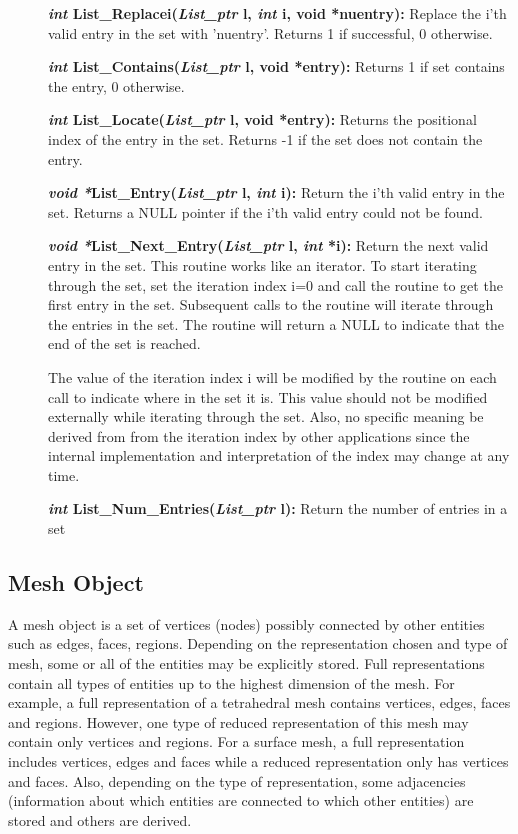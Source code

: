 \documentclass[12pt]{article}
\begin{document}
\begin{description}
\item[]\textbf{\textit{int} List\_Replacei(\textit{List\_ptr} l, \textit{int}
i, void *nuentry):} Replace the i'th valid entry in the set with
'nuentry'. Returns 1 if successful, 0 otherwise.

\item[]\textbf{\textit{int} List\_Contains(\textit{List\_ptr} l, void *entry):}
Returns 1 if set contains the entry, 0 otherwise.

\item[]\textbf{\textit{int} List\_Locate(\textit{List\_ptr} l, void *entry):}
Returns the positional index of the entry in the set. Returns -1 if
the set does not contain the entry.

\item[]\textbf{\textit{void *}List\_Entry(\textit{List\_ptr} l, \textit{int}
i):} Return the i'th valid entry in the set.  Returns a NULL pointer if
the i'th valid entry could not be found.

\item[]\textbf{\textit{void *}List\_Next\_Entry(\textit{List\_ptr} l,
\textit{int} *i):} Return the next valid entry in the set. This routine
works like an iterator. To start iterating through the set, set the
iteration index i=0 and call the routine to get the first entry in the
set. Subsequent calls to the routine will iterate through the entries
in the set. The routine will return a NULL to indicate that the end of
the set is reached.

The value of the iteration index i will be modified by the routine on
each call to indicate where in the set it is. This value should not be
modified externally while iterating through the set. Also, no specific
meaning be derived from from the iteration index by other applications
since the internal implementation and interpretation of the index may
change at any time.

\item[]\textbf{\textit{int} List\_Num\_Entries(\textit{List\_ptr} l):} Return
the number of entries in a set
\end{description}

\newpage
\subsection{Mesh Object}

A mesh object is a set of vertices (nodes) possibly connected by other
entities such as edges, faces, regions. Depending on the
representation chosen and type of mesh, some or all of the entities
may be explicitly stored.  Full representations contain all types of
entities up to the highest dimension of the mesh. For example, a full
representation of a tetrahedral mesh contains vertices, edges, faces
and regions. However, one type of reduced representation of this mesh
may contain only vertices and regions. For a surface mesh, a full
representation includes vertices, edges and faces while a reduced
representation only has vertices and faces. Also, depending on the
type of representation, some adjacencies (information about which
entities are connected to which other entities) are stored and others
are derived.
\end{document}
